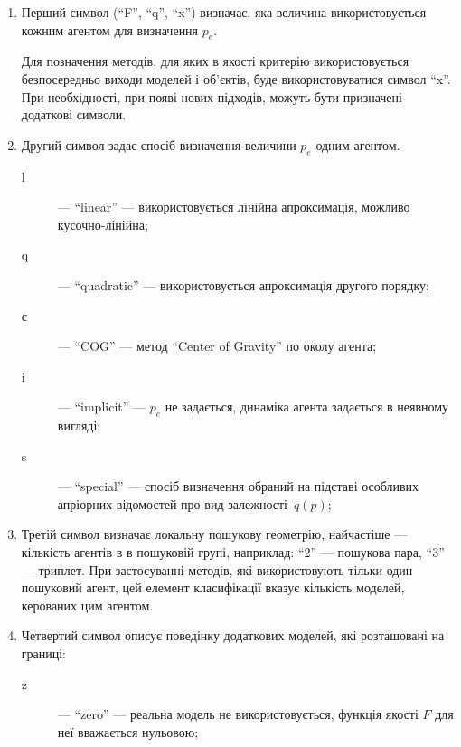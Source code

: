 \begin{enumerate}

  \item
    Перший символ (``F'', ``q'', ``x'') визначає,
    яка величина використовується кожним агентом для визначення $p_e$.

    Для позначення методів, для яких в якості критерію
    використовується безпосередньо виходи моделей і об'єктів, буде
    використовуватися символ ``x''. При необхідності, при появі нових
    підходів, можуть бути призначені додаткові символи.

  \item
    Другий символ
    задає спосіб визначення величини $p_e$ одним агентом.

    \begin{description}

      \item[l]  --- ``linear'' ---
        використовується лінійна апроксимація, можливо кусочно-лінійна;

      \item[q]  --- ``quadratic'' ---
        використовується апроксимація другого порядку;

      \item[с] --- ``COG'' ---
        метод ``Center of Gravity'' по околу агента;

      \item[i] --- ``implicit'' ---
       $ p_e $ не задається, динаміка агента задається в неявному вигляді;

      \item[s] --- ``special'' ---
        спосіб визначення обраний на підставі особливих апріорних
        відомостей про вид залежності~$q(p)$;

    \end{description}

  \item
    Третій символ визначає локальну пошукову геометрію, найчастіше --- кількість
    агентів в в пошуковій групі, наприклад: ``2'' --- пошукова пара, ``3'' --- триплет.
    При застосуванні методів, які використовують тільки один
    пошуковий агент, цей елемент класифікації вказує кількість
    моделей, керованих цим агентом.

  \item
    Четвертий символ
    описує поведінку додаткових моделей, які розташовані на границі:
    \begin{description}

      \item[z]  --- ``zero'' ---
        реальна модель не використовується, функція якості
        $ F $ для неї вважається нульовою;


\end{description}
\end{enumerate}
